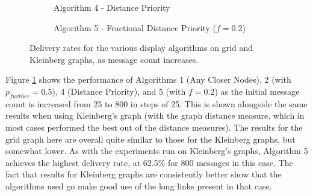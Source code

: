 \documentclass[bsc,frontabs,twoside,singlespacing,parskip,deptreport]{infthesis}     %
\begin{document}
\begin{figure}
%
\par\bigskip 
%
\begin{subfigure}[t]{0.40\textwidth}
\captionsetup{justification=centering}
\caption{Algorithm 4 - Distance Priority}
\end{subfigure}
%
\begin{subfigure}[t]{0.40\textwidth}
\captionsetup{justification=centering}
\caption{Algorithm 5 - Fractional Distance Priority ($f=0.2$)}
\end{subfigure}
\caption{Delivery rates for the various display algorithms on grid and Kleinberg graphs, as message count increases. }
\label{fig:grid_show_models}
\end{figure}

Figure \ref{fig:grid_show_models} shows the performance of Algorithms 1 (Any Closer Nodes), 2 (with $p_{further}=0.5$), 4 (Distance Priority), and 5 (with $f=0.2$) as the initial message count is increased from 25 to 800 in steps of 25. This is shown alongside the same results when using Kleinberg's graph (with the graph distance measure, which in most cases performed the best out of the distance measures). The results for the grid graph here are overall quite similar to those for the Kleinberg graphs, but somewhat lower. As with the experiments run on Kleinberg's graphs, Algorithm 5 achieves the highest delivery rate, at 62.5\% for 800 messages in this case. The fact that results for Kleinberg graphs are consistently better show that the algorithms used go make good use of the long links present in that case.
\end{document}
